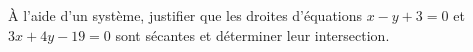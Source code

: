 \begin{exo}{}
	À l'aide d'un système, justifier que les droites d'équations $x - y + 3 = 0$ et $3x + 4y - 19 = 0$ sont sécantes et déterminer leur intersection.
\end{exo}
